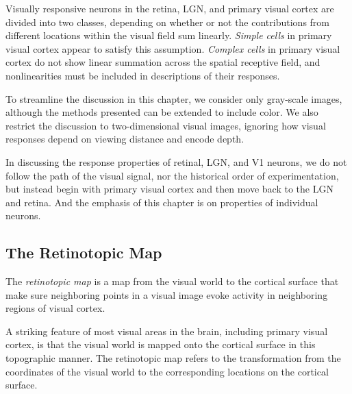 \begin{defn}
  \label{simpleComplexCells}
  Visually responsive neurons in the retina, LGN, and primary visual cortex are divided into two classes, depending on whether or not the contributions from different locations within the visual field sum linearly. \emph{Simple cells} in primary visual cortex appear to satisfy this assumption. \emph{Complex cells} in primary visual cortex do not show linear summation across the spatial receptive field, and nonlinearities must be included in descriptions of their responses.
\end{defn}

\begin{asm}
  \label{asm:light}
  To streamline the discussion in this chapter, we consider only gray-scale images, although the methods presented can be extended to include color. We also restrict the discussion to two-dimensional visual images, ignoring how visual responses depend on viewing distance and encode depth.
\end{asm}

\begin{rem}
  In discussing the response properties of retinal, LGN, and V1 neurons, we do not follow the path of the visual signal, nor the historical order of experimentation, but instead begin with primary visual cortex and then move back to the LGN and retina. And the emphasis of this chapter is on properties of individual neurons.
\end{rem}

\subsection{The Retinotopic Map}
\label{sec:retinotopicMap}
\begin{defn}
  \label{def:retinotopicMap}
  The \emph{retinotopic map} is a map from the visual world to the cortical surface that make sure neighboring points in a visual image evoke activity in neighboring regions of visual cortex. 
\end{defn}

\begin{rem}
  A striking feature of most visual areas in the brain, including primary visual cortex, is that the visual world is mapped onto the cortical surface in this topographic manner.
  The retinotopic map refers to the transformation from the coordinates of the visual world to the corresponding locations on the cortical surface.
\end{rem}

